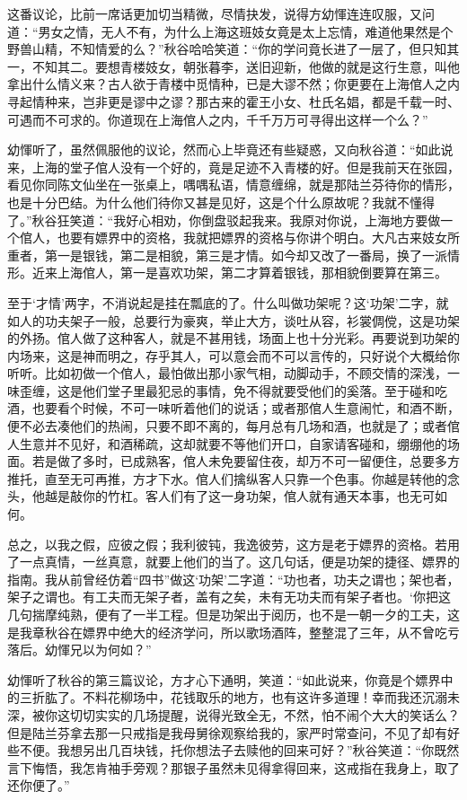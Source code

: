\documentclass[12pt,UTF8]{ctexbook}
\begin{document}
{{{这番议论，比前一席话更加切当精微，尽情抉发，说得方幼惲连连叹服，又问道：“男女之情，无人不有，为什么上海这班妓女竟是太上忘情，难道他果然是个野兽山精，不知情爱的么？”秋谷哈哈笑道：“你的学问竟长进了一层了，但只知其一，不知其二。要想青楼妓女，朝张暮李，送旧迎新，他做的就是这行生意，叫他拿出什么情义来？古人欲于青楼中觅情种，已是大谬不然；你更要在上海倌人之内寻起情种来，岂非更是谬中之谬？那古来的霍王小女、杜氏名娼，都是千载一时、可遇而不可求的。你道现在上海倌人之内，千千万万可寻得出这样一个么？”

幼惲听了，虽然佩服他的议论，然而心上毕竟还有些疑惑，又向秋谷道：“如此说来，上海的堂子倌人没有一个好的，竟是足迹不入青楼的好。但是我前天在张园，看见你同陈文仙坐在一张桌上，喁喁私语，情意缠绵，就是那陆兰芬待你的情形，也是十分巴结。为什么他们待你又甚是见好，这是个什么原故呢？我就不懂得了。”秋谷狂笑道：“我好心相劝，你倒盘驳起我来。我原对你说，上海地方要做一个倌人，也要有嫖界中的资格，我就把嫖界的资格与你讲个明白。大凡古来妓女所重者，第一是银钱，第二是相貌，第三是才情。如今却又改了一番局，换了一派情形。近来上海倌人，第一是喜欢功架，第二才算着银钱，那相貌倒要算在第三。

至于‘才情’两字，不消说起是挂在瓢底的了。什么叫做功架呢？这‘功架’二字，就如人的功夫架子一般，总要行为豪爽，举止大方，谈吐从容，衫裳倜傥，这是功架的外扬。倌人做了这种客人，就是不甚用钱，场面上也十分光彩。再要说到功架的内场来，这是神而明之，存乎其人，可以意会而不可以言传的，只好说个大概给你听听。比如初做一个倌人，最怕做出那小家气相，动脚动手，不顾交情的深浅，一味歪缠，这是他们堂子里最犯忌的事情，免不得就要受他们的奚落。至于碰和吃酒，也要看个时候，不可一味听着他们的说话；或者那倌人生意闹忙，和酒不断，便不必去凑他们的热闹，只要不即不离的，每月总有几场和酒，也就是了；或者倌人生意并不见好，和酒稀疏，这却就要不等他们开口，自家请客碰和，绷绷他的场面。若是做了多时，已成熟客，倌人未免要留住夜，却万不可一留便住，总要多方推托，直至无可再推，方才下水。倌人们擒纵客人只靠一个色事。你越是转他的念头，他越是敲你的竹杠。客人们有了这一身功架，倌人就有通天本事，也无可如何。

总之，以我之假，应彼之假；我利彼钝，我逸彼劳，这方是老于嫖界的资格。若用了一点真情，一丝真意，就要上他们的当了。这几句话，便是功架的捷径、嫖界的指南。我从前曾经仿着“四书”做这‘功架’二字道：“功也者，功夫之谓也；架也者，架子之谓也。有工夫而无架子者，盖有之矣，未有无功夫而有架子者也。‘你把这几句揣摩纯熟，便有了一半工程。但是功架出于阅历，也不是一朝一夕的工夫，这是我章秋谷在嫖界中绝大的经济学问，所以歌场酒阵，整整混了三年，从不曾吃亏落后。幼惲兄以为何如？”

幼惲听了秋谷的第三篇议论，方才心下通明，笑道：“如此说来，你竟是个嫖界中的三折肱了。不料花柳场中，花钱取乐的地方，也有这许多道理！幸而我还沉溺未深，被你这切切实实的几场提醒，说得光致全无，不然，怕不闹个大大的笑话么？但是陆兰芬拿去那一只戒指是我母舅徐观察给我的，家严时常查问，不见了却有好些不便。我想另出几百块钱，托你想法子去赎他的回来可好？”秋谷笑道：“你既然言下悔悟，我怎肯袖手旁观？那银子虽然未见得拿得回来，这戒指在我身上，取了还你便了。”

}}}
\end{document}
